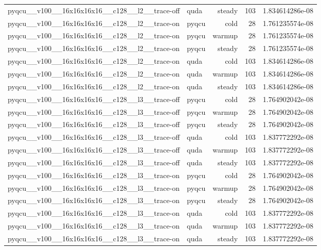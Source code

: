 \begin{table}[htbp]
\begin{tabular}{@{}llrrr@{}}
pyqcu\_\_v100\_\_16x16x16x16\_\_c128\_\_l2\_\_trace-off & quda & steady & 103 & 1.834614286e-08 \\
pyqcu\_\_v100\_\_16x16x16x16\_\_c128\_\_l2\_\_trace-on & pyqcu & cold & 28 & 1.761235574e-08 \\
pyqcu\_\_v100\_\_16x16x16x16\_\_c128\_\_l2\_\_trace-on & pyqcu & warmup & 28 & 1.761235574e-08 \\
pyqcu\_\_v100\_\_16x16x16x16\_\_c128\_\_l2\_\_trace-on & pyqcu & steady & 28 & 1.761235574e-08 \\
pyqcu\_\_v100\_\_16x16x16x16\_\_c128\_\_l2\_\_trace-on & quda & cold & 103 & 1.834614286e-08 \\
pyqcu\_\_v100\_\_16x16x16x16\_\_c128\_\_l2\_\_trace-on & quda & warmup & 103 & 1.834614286e-08 \\
pyqcu\_\_v100\_\_16x16x16x16\_\_c128\_\_l2\_\_trace-on & quda & steady & 103 & 1.834614286e-08 \\
pyqcu\_\_v100\_\_16x16x16x16\_\_c128\_\_l3\_\_trace-off & pyqcu & cold & 28 & 1.764902042e-08 \\
pyqcu\_\_v100\_\_16x16x16x16\_\_c128\_\_l3\_\_trace-off & pyqcu & warmup & 28 & 1.764902042e-08 \\
pyqcu\_\_v100\_\_16x16x16x16\_\_c128\_\_l3\_\_trace-off & pyqcu & steady & 28 & 1.764902042e-08 \\
pyqcu\_\_v100\_\_16x16x16x16\_\_c128\_\_l3\_\_trace-off & quda & cold & 103 & 1.837772292e-08 \\
pyqcu\_\_v100\_\_16x16x16x16\_\_c128\_\_l3\_\_trace-off & quda & warmup & 103 & 1.837772292e-08 \\
pyqcu\_\_v100\_\_16x16x16x16\_\_c128\_\_l3\_\_trace-off & quda & steady & 103 & 1.837772292e-08 \\
pyqcu\_\_v100\_\_16x16x16x16\_\_c128\_\_l3\_\_trace-on & pyqcu & cold & 28 & 1.764902042e-08 \\
pyqcu\_\_v100\_\_16x16x16x16\_\_c128\_\_l3\_\_trace-on & pyqcu & warmup & 28 & 1.764902042e-08 \\
pyqcu\_\_v100\_\_16x16x16x16\_\_c128\_\_l3\_\_trace-on & pyqcu & steady & 28 & 1.764902042e-08 \\
pyqcu\_\_v100\_\_16x16x16x16\_\_c128\_\_l3\_\_trace-on & quda & cold & 103 & 1.837772292e-08 \\
pyqcu\_\_v100\_\_16x16x16x16\_\_c128\_\_l3\_\_trace-on & quda & warmup & 103 & 1.837772292e-08 \\
pyqcu\_\_v100\_\_16x16x16x16\_\_c128\_\_l3\_\_trace-on & quda & steady & 103 & 1.837772292e-08 \\

\end{tabular}
\end{table}

